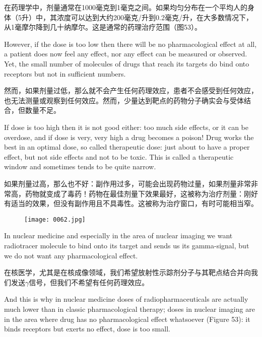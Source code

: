\documentclass[dvipsnames, svgnames,a4paper,11pt]{article}
\begin{document}
在药理学中，剂量通常在1000毫克到1毫克之间。如果均匀分布在一个平均人的身体（5升）中，其浓度可以达到大约200毫克/升到0.2毫克/升，在大多数情况下，从1毫摩尔降到几十纳摩尔。这是通常的药理治疗范围（图53）。

However, if the dose is too low then there will be no pharmacological effect at all, a patient does now feel any effect, nor any effect can be measured or observed. Yet, the small number of molecules of drugs that reach its targets do bind onto receptors but not in sufficient numbers.

然而，如果剂量过低，那么就不会产生任何药理效应，患者不会感受到任何效应，也无法测量或观察到任何效应。然而，少量达到靶点的药物分子确实会与受体结合，但数量不足。

If dose is too high then it is not good either: too much side effects, or it can be overdose, and if dose is very, very high a drug becomes a poison! Drug works the best in an optimal dose, so called therapeutic dose: just about to have a proper effect, but not side effects and not to be toxic. This is called a therapeutic window and sometimes tends to be quite narrow.

如果剂量过高，那么也不好：副作用过多，可能会出现药物过量，如果剂量非常非常高，药物就变成了毒药！药物在最佳剂量下效果最好，这被称为治疗剂量：刚好有适当的效果，但没有副作用且不具毒性。这被称为治疗窗口，有时可能相当窄。
\begin{figure}[ht]
    \centering
    \texttt{[image: 0062.jpg]}
     \label{fig53}
\end{figure}


In nuclear medicine and especially in the area of nuclear imaging we want radiotracer molecule to bind onto its target and sends us its gamma-signal, but we do not want any pharmacological effect.

在核医学，尤其是在核成像领域，我们希望放射性示踪剂分子与其靶点结合并向我们发送$\gamma$信号，但我们不希望有任何药理效应。

And this is why in nuclear medicine doses of radiopharmaceuticals are actually much lower than in classic pharmacological therapy; doses in nuclear imaging are in the area where drug has no pharmacological effect whatsoever (Figure 53): it binds receptors but exerts no effect, dose is too small.
\end{document}
